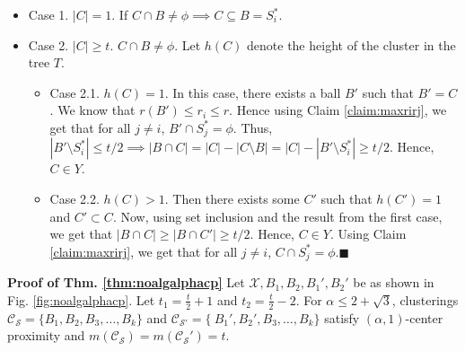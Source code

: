 \documentclass[orivec]{llncs}
\newcommand{\mc}{\mathcal}
\renewcommand{\qed}{\hfill\ensuremath{\blacksquare}}
\begin{document}
\begin{itemize}[nolistsep,leftmargin=*]
\item Case 1. $|C| = 1$. If $C \cap B \neq \phi \implies C \subseteq B = S_i^*$.
\item Case 2. $|C|\ge t$. $C \cap B \neq \phi$. Let $h(C)$ denote the height of the cluster in the tree $T$. 
\begin{itemize}[leftmargin=*]
\renewcommand\labelitemii{$\circ$}
\item Case 2.1. $h(C) = 1$. In this case, there exists a ball $B'$ such that $B' = C$. We know that $r(B') \le r_i \le r$. Hence using Claim \ref{claim:maxrirj}, we get that for all $j \neq i$, $B' \cap S_j^* = \phi$. Thus, $|B'\setminus S_i^*| \le t/2 \implies |B\cap C| = |C| - |C\setminus B| = |C| - |B'\setminus S_i^*| \ge t/2$. Hence, $C \in Y$.

\item Case 2.2. $h(C) > 1$. Then there exists some $C'$ such that $h(C') = 1$ and $C' \subset C$. Now, using set inclusion and the result from the first case, we get that $|B\cap C| \ge |B\cap C'| \ge t/2$. Hence, $C \in Y$. Using Claim \ref{claim:maxrirj}, we get that for all $j \neq i$, $C \cap S_j^* = \phi$.\qed\\
\end{itemize} 
\end{itemize}


\noindent\textbf{Proof of Thm. \ref{thm:noalgalphacp}}
Let $\mc X, B_1, B_2, B_1', B_2'$ be as shown in Fig. \ref{fig:noalgalphacp}. Let $t_1 = \frac{t}{2}+1$ and $t_2 = \frac{t}{2}-2$. For $\alpha \le 2+\sqrt{3}$, clusterings $\mc C_{\mc S} = \{B_1, B_2, B_3, \ldots, B_k\}$ and $\mc C_{\mc S'} = \{\ B_1', B_2', B_3, \ldots, B_k\}$ satisfy $(\alpha, 1)$-center proximity and $m(\mc C_{\mc S}) = m(\mc C_{\mc S}') = t$.
\end{document}
